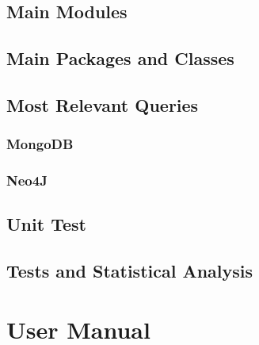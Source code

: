 \documentclass[a4paper]{report}
\begin{document}
\section{Main Modules}
\section{Main Packages and Classes}
\section{Most Relevant Queries}
\subsection{MongoDB}
\subsection{Neo4J}
\section{Unit Test}
\section{Tests and Statistical Analysis}

\chapter{User Manual}
\end{document}
